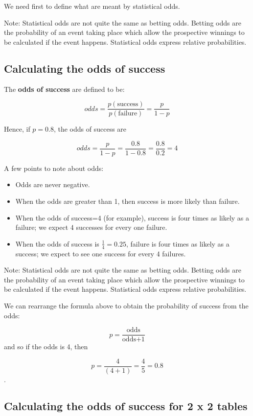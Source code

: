 \documentclass[
  oneside]{krantz}
\providecommand{\tightlist}{%
  \setlength{\itemsep}{0pt}\setlength{\parskip}{0pt}}
\begin{document}
We need first to define what are meant by statistical odds.

Note: Statistical odds are not quite the same as betting odds. Betting odds are the probability of an event taking place which allow the prospective winnings to be calculated if the event happens. Statistical odds express relative probabilities.

\hypertarget{calculating-the-odds-of-success}{%
\subsection{Calculating the odds of success}\label{calculating-the-odds-of-success}}

The \textbf{odds of success} are defined to be:

\[odds=\frac{p(\textrm{success})}{p(\textrm{failure})} = \frac{p}{1-p}\]

Hence, if \(p=0.8\), the odds of success are

\[odds=\frac{p}{1-p}=\frac{0.8}{1-0.8}=\frac{0.8}{0.2}=4\]

A few points to note about odds:

\begin{itemize}
\tightlist
\item
  Odds are never negative.
\item
  When the odds are greater than 1, then success is more likely than failure.
\item
  When the odds of success=4 (for example), success is four times as likely as a failure; we expect 4 successes for every one failure.
\item
  When the odds of success is \(\frac{1}{4}=0.25\), failure is four times as likely as a success; we expect to see one success for every 4 failures.
\end{itemize}

Note: Statistical odds are not quite the same as betting odds. Betting odds are the probability of an event taking place which allow the prospective winnings to be calculated if the event happens. Statistical odds express relative probabilities.

We can rearrange the formula above to obtain the probability of success from the odds:

\[p=\frac{\textrm{odds}}{\textrm{odds+1}}\]
and so if the odds is 4, then

\[p=\frac{4}{(4+1)}=\frac{4}{5}=0.8\].

\hypertarget{calculating-the-odds-of-success-for-2-x-2-tables}{%
\subsection{Calculating the odds of success for 2 x 2 tables}\label{calculating-the-odds-of-success-for-2-x-2-tables}}
\end{document}
